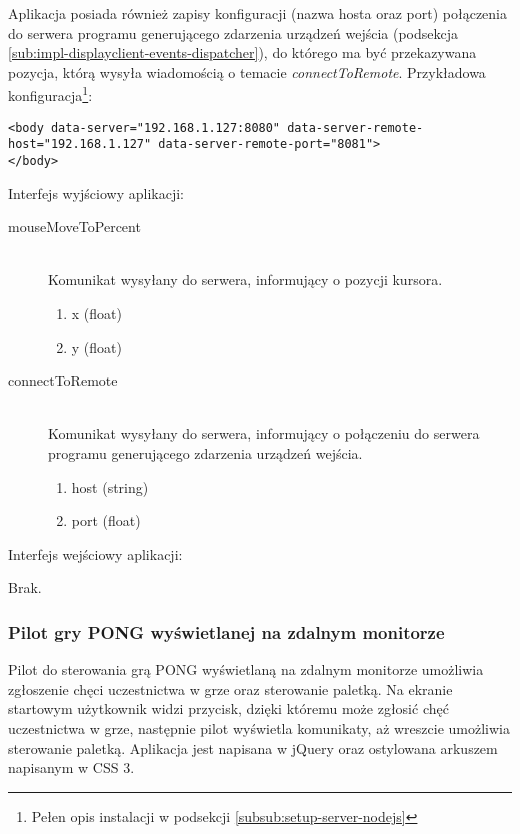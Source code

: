 Aplikacja posiada również zapisy konfiguracji (nazwa hosta oraz port) połączenia do serwera programu generującego zdarzenia urządzeń wejścia (podsekcja \ref{sub:impl-displayclient-events-dispatcher}), do którego ma być przekazywana pozycja, którą wysyła wiadomością o temacie \emph{connectToRemote}. Przykładowa konfiguracja\footnote{Pełen opis instalacji w podsekcji \ref{subsub:setup-server-nodejs}}:

\lstset{language=HTML}
\begin{lstlisting}
<body data-server="192.168.1.127:8080" data-server-remote-host="192.168.1.127" data-server-remote-port="8081">
</body>
\end{lstlisting}

Interfejs wyjściowy aplikacji:

\begin{description}
	\item[mouseMoveToPercent] \hfill \\
	Komunikat wysyłany do serwera, informujący o pozycji kursora.
	\begin{enumerate}
		\item x (float)
		\item y (float)
	\end{enumerate}
\end{description}

\begin{description}
	\item[connectToRemote] \hfill \\
	Komunikat wysyłany do serwera, informujący o połączeniu do serwera programu generującego zdarzenia urządzeń wejścia.
	\begin{enumerate}
		\item host (string)
		\item port (float)
	\end{enumerate}
\end{description}

Interfejs wejściowy aplikacji:

Brak.

\subsubsection{Pilot gry PONG wyświetlanej na zdalnym monitorze}

Pilot do sterowania grą PONG wyświetlaną na zdalnym monitorze umożliwia zgłoszenie chęci uczestnictwa w grze oraz sterowanie paletką. Na ekranie startowym użytkownik widzi przycisk, dzięki któremu może zgłosić chęć uczestnictwa w grze, następnie pilot wyświetla komunikaty, aż wreszcie umożliwia sterowanie paletką. Aplikacja jest napisana w jQuery oraz ostylowana arkuszem napisanym w CSS 3.

